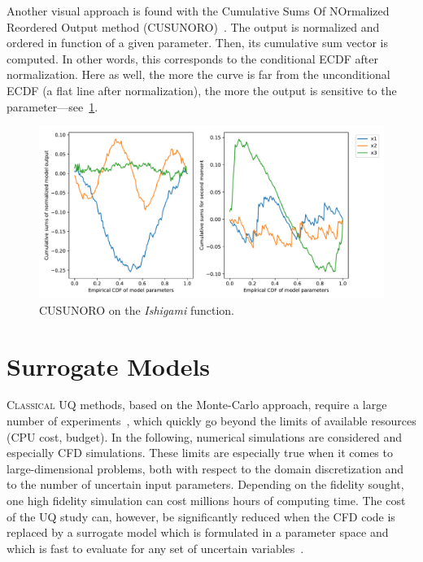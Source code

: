 Another visual approach is found with the Cumulative Sums Of NOrmalized Reordered Output method (CUSUNORO)~\cite{Plischke2012}. The output is normalized and ordered in function of a given parameter. Then, its cumulative sum vector is computed. In other words, this corresponds to the conditional ECDF after normalization. Here as well, the more the curve is far from the unconditional ECDF (a flat line after normalization), the more the output is sensitive to the parameter---see~\cref{fig:cusunoro}.

\begin{figure}[!ht]
\centering
\includegraphics[width=\linewidth,keepaspectratio]{fig/literature/cusunoro-ishigami.pdf}
\caption{CUSUNORO on the \emph{Ishigami} function.}
\label{fig:cusunoro}
\end{figure}

\newpage

\section{Surrogate Models}\label{sec:surrogate}

\lettrine{C}{lassical} UQ methods, based on the Monte-Carlo approach, require a large number of experiments~\citep{iooss2010,iooss2016,lamboni2011,lemaitreknio2010,Saltelli2007,storlie2009}, which quickly go beyond the limits of available resources (CPU cost, budget). In the following, numerical simulations are considered and especially CFD simulations. These limits are especially true when it comes to large-dimensional problems, both with respect to the domain discretization and to the number of uncertain input parameters. Depending on the fidelity sought, one high fidelity simulation can cost millions hours of computing time. The cost of the UQ study can, however, be significantly reduced when the CFD code is replaced by a surrogate model which is formulated in a parameter space and which is fast to evaluate for any set of uncertain variables~\cite{martin2005}.

